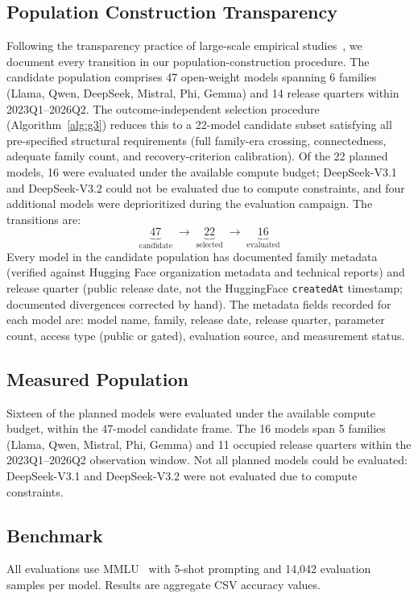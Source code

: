 \documentclass[11pt]{article}
\theoremstyle{definition}
\theoremstyle{plain}
\begin{document}
\subsection{Population Construction Transparency}
Following the transparency practice of large-scale empirical studies~\cite{kim2025}, we document every transition in our population-construction procedure. The candidate population comprises 47 open-weight models spanning 6 families (Llama, Qwen, DeepSeek, Mistral, Phi, Gemma) and 14 release quarters within 2023Q1--2026Q2. The outcome-independent selection procedure (Algorithm~\ref{alg:g3}) reduces this to a 22-model candidate subset satisfying all pre-specified structural requirements (full family-era crossing, connectedness, adequate family count, and recovery-criterion calibration). Of the 22 planned models, 16 were evaluated under the available compute budget; DeepSeek-V3.1 and DeepSeek-V3.2 could not be evaluated due to compute constraints, and four additional models were deprioritized during the evaluation campaign. The transitions are:
\[
\underbrace{47}_{\text{candidate}} \;\longrightarrow\; \underbrace{22}_{\text{selected}} \;\longrightarrow\; \underbrace{16}_{\text{evaluated}}
\]
Every model in the candidate population has documented family metadata (verified against Hugging Face organization metadata and technical reports) and release quarter (public release date, not the HuggingFace \texttt{createdAt} timestamp; documented divergences corrected by hand). The metadata fields recorded for each model are: model name, family, release date, release quarter, parameter count, access type (public or gated), evaluation source, and measurement status.

\subsection{Measured Population}
Sixteen of the planned models were evaluated under the available compute budget, within the 47-model candidate frame. The 16 models span 5 families (Llama, Qwen, Mistral, Phi, Gemma) and 11 occupied release quarters within the 2023Q1--2026Q2 observation window. Not all planned models could be evaluated: DeepSeek-V3.1 and DeepSeek-V3.2 were not evaluated due to compute constraints.

\subsection{Benchmark}
All evaluations use MMLU~\cite{hendrycks2021} with 5-shot prompting and 14,042 evaluation samples per model. Results are aggregate CSV accuracy values.
\end{document}
